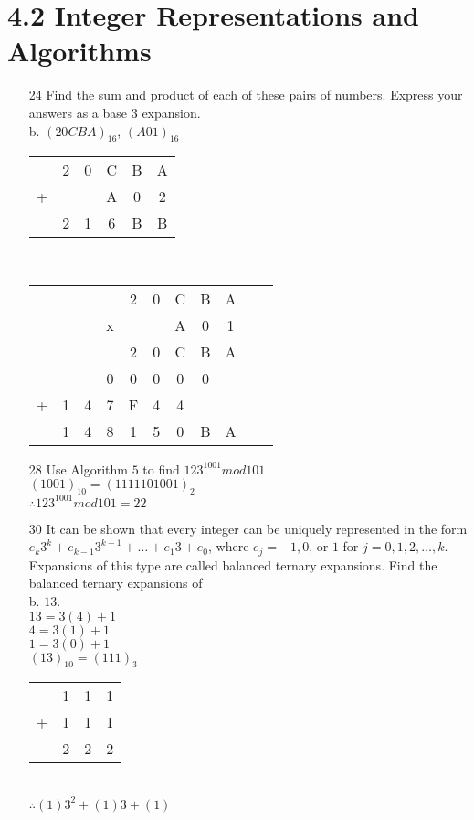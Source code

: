 \documentclass[a4paper]{article}
\newcommand\tab[1][0.5cm]{\hspace*{#1}}
\begin{document}
  \section*{4.2 Integer Representations and Algorithms}
  \begin{itemize}
    \item[24] Find the sum and product of each of these pairs of numbers. Express your answers as a base $3$ expansion. \\
      b. $(20CBA)_{16}$, $(A01)_{16}$ \\
      \begin{tabular}{cccccc}
          & 2 & 0 & C & B & A \\
        + &   &   & A & 0 & 2 \\
        \hline
          & 2 & 1 & 6 & B & B 
      \end{tabular} \\
      \begin{tabular}{ccccccccccc}
          &   &   &   & 2 & 0 & C & B & A \\
          &   &   & x &   &   & A & 0 & 1 \\
        \hline
          &   &   &   & 2 & 0 & C & B & A \\
          &   &   & 0 & 0 & 0 & 0 & 0 &   \\
        + & 1 & 4 & 7 & F & 4 & 4 &   &   \\
        \hline
          & 1 & 4 & 8 & 1 & 5 & 0 & B & A
      \end{tabular}
    \item[28] Use Algorithm $5$ to find $123^{1001} mod 101$ \\
    \tab $(1001)_{10} = (1111101001)_{2}$ \\
    \tab $\therefore 123^{1001} mod 101 = 22$ 
    \item[30] It can be shown that every integer can be uniquely represented in the form $e_{k}3^{k} + e_{k - 1}3^{k - 1} + \dots + e_{1}3 + e_{0}$, where $e_{j} = -1, 0$, or $1$ for $j = 0, 1, 2, \dots , k$. Expansions of this type are called balanced ternary expansions. Find the balanced ternary expansions of \\
      b. $13$. \\
      \tab $13 = 3(4) + 1$ \\
      \tab $4 = 3(1) + 1$ \\
      \tab $1 = 3(0) + 1$ \\
      \tab $(13)_{10} = (111)_{3}$ \\
      \tab\begin{tabular}{cccc}
          & 1 & 1 & 1 \\
        + & 1 & 1 & 1 \\
        \hline
          & 2 & 2 & 2 
      \end{tabular} \\
      \tab $\therefore (1)3^{2} + (1)3 + (1)$
  \end{itemize}
\end{document}
